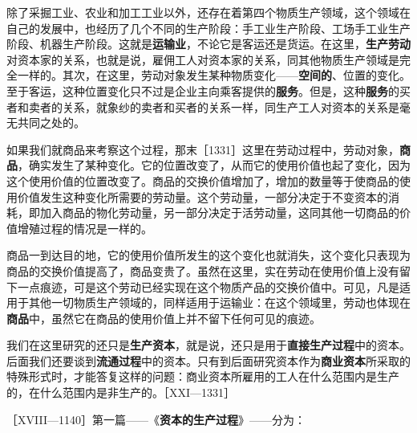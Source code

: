 
除了采掘工业、农业和加工工业以外，还存在着第四个物质生产领域，这个领域在自己的发展中，也经历了几个不同的生产阶段：手工业生产阶段、工场手工业生产阶段、机器生产阶段。这就是\textbf{运输业}，不论它是客运还是货运。在这里，\textbf{生产劳动}对资本家的关系，也就是说，雇佣工人对资本家的关系，同其他物质生产领域是完全一样的。其次，在这里，劳动对象发生某种物质变化——\textbf{空间的}、位置的变化。至于客运，这种位置变化只不过是企业主向乘客提供的\textbf{服务}。但是，这种\textbf{服务}的买者和卖者的关系，就象纱的卖者和买者的关系一样，同生产工人对资本的关系是毫无共同之处的。

如果我们就商品来考察这个过程，那末［1331］这里在劳动过程中，劳动对象，\textbf{商品}，确实发生了某种变化。它的位置改变了，从而它的使用价值也起了变化，因为这个使用价值的位置改变了。商品的交换价值增加了，增加的数量等于使商品的使用价值发生这种变化所需要的劳动量。这个劳动量，一部分决定于不变资本的消耗，即加入商品的物化劳动量，另一部分决定于活劳动量，这同其他一切商品的价值增殖过程的情况是一样的。

商品一到达目的地，它的使用价值所发生的这个变化也就消失，这个变化只表现为商品的交换价值提高了，商品变贵了。虽然在这里，实在劳动在使用价值上没有留下一点痕迹，可是这个劳动已经实现在这个物质产品的交换价值中。可见，凡是适用于其他一切物质生产领域的，同样适用于运输业：在这个领域里，劳动也体现在\textbf{商品}中，虽然它在商品的使用价值上并不留下任何可见的痕迹。


我们在这里研究的还只是\textbf{生产资本}，就是说，还只是用于\textbf{直接生产过程}中的资本。后面我们还要谈到\textbf{流通过程}中的资本。只有到后面研究资本作为\textbf{商业资本}所采取的特殊形式时，才能答复这样的问题：商业资本所雇用的工人在什么范围内是生产的，在什么范围内是非生产的。［XXI—1331］



［XVIII—1140］第一篇——《\textbf{资本的生产过程}》——分为：

